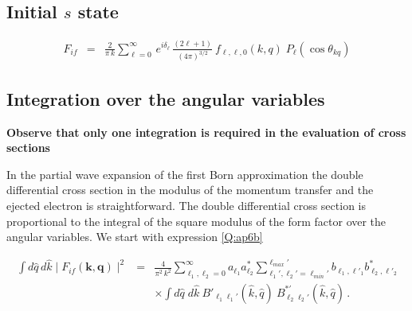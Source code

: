 \subsection{Initial $s$ state}

\begin{eqnarray}\label{Q:ap10}
F_{if}&=& \frac{2}{\pi \, k} \sum_{\ell=0}^{\infty} \, e^{i
\delta_{\ell}} \,\frac{(2 \ell + 1)}{(4 \pi)^{3/2}}\
f_{\ell,\ell,0}(k,q)\; P_{\ell}(\cos{\theta_{kq}})
\end{eqnarray}

\subsection{Integration over the angular variables}

\textbf{Observe that only one integration is required in the evaluation
of cross sections}

In the partial wave expansion of the first Born approximation the
double differential cross section in the modulus of the momentum
transfer and the ejected electron is straightforward. The double
differential cross section is proportional to the integral of the
square modulus of the form factor over the angular variables. We start
with expression \ref{Q:ap6b}

\begin{eqnarray}\label{Q:ap6d}
\int d \hat{q} \, d \hat{k} \mid F_{if}(\bm{k},\bm{q})\mid ^{2}
&=& \frac{4}{\pi^{2} \, k^{2}}  \sum_{\ell_{1},\ell_{2}=0}^{\infty}
a_{\ell_{1}} a^{*}_{\ell_{2}}
\sum_{\ell_{1}',\ell_{2}'=\ell_{min}'}^{\ell_{max}'}
b_{\ell_{1},\ell'_{1}} b^{*}_{\ell_{2},\ell'_{2}} \nonumber
\\
&& {\times} \int d \hat{q} \;d \hat{k}  \ B'_{\ell_{1} \ell_{1}'}
(\hat{k}, \hat{q})  \ B^{*'}_{\ell_{2} \ell_{2}'}(\hat{k}, \hat{q}) \,
.
\end{eqnarray}

